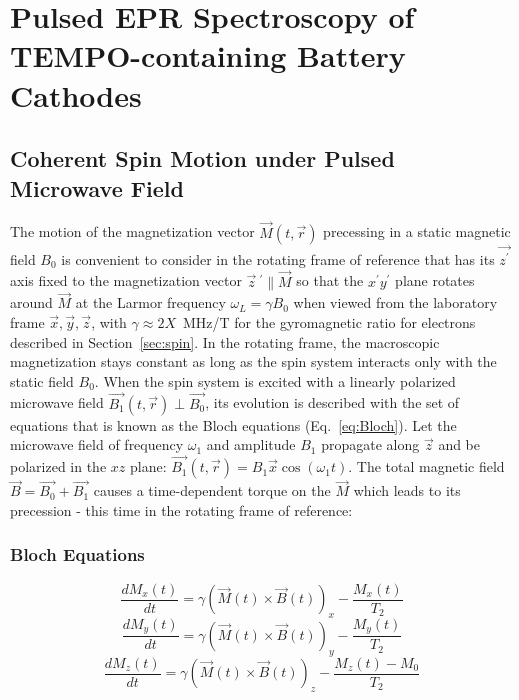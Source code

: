 \chapter{Pulsed EPR Spectroscopy of TEMPO-containing Battery Cathodes}
\label{ch:pulsed_epr}

\section{Coherent Spin Motion under Pulsed Microwave Field}
The motion of the magnetization vector $\vec{M}(t,\vec{r})$ precessing in a static magnetic field $B_0$ is convenient to consider in the rotating frame of reference that has its $\vec{z^{\prime}}$ axis fixed to the magnetization vector ${\vec{z}}~^{\prime}\parallel\vec{M}$ so that the $x^{\prime} y^{\prime}$ plane rotates around $\vec{M}$ at the Larmor frequency $\omega_L=\gamma B_0$ when viewed from the laboratory frame $\vec{x},\vec{y},\vec{z}$, with $\gamma\approx2X$~MHz/T for the gyromagnetic ratio for electrons described in Section~\ref{sec:spin}. In the rotating frame, the macroscopic magnetization stays constant as long as the spin system interacts only with the static field $B_0$. When the spin system is excited with a linearly polarized microwave field $\vec{B_1}(t,\vec{r})\perp\vec{B_0}$, its evolution is described with the set of equations that is known as the Bloch equations (Eq.~\ref{eq:Bloch}). Let the microwave field of frequency $\omega_1$ and amplitude $B_1$ propagate along $\vec{z}$ and be polarized in the $xz$ plane: $\vec{B_1}(t,\vec{r})=B_1\vec{x}\cos\left(\omega_1t\right)$. The total magnetic field $\vec{B}=\vec{B_0}+\vec{B_1}$ causes a time-dependent torque on the $\vec{M}$ which leads to its precession - this time in the rotating frame of reference:

\subsection{Bloch Equations}
\begin{equation}
\label{eq:Bloch}
\frac{dM_x(t)}{dt} = \gamma\left(\vec{M}(t)\times\vec{B}(t)\right)_x - \frac{M_x(t)}{T_2}
\end{equation}
\begin{equation}
\label{eq:Bloch}
\frac{dM_y(t)}{dt} = \gamma\left(\vec{M}(t)\times\vec{B}(t)\right)_y - \frac{M_y(t)}{T_2}
\end{equation}
\begin{equation}
\label{eq:Bloch}
\frac{dM_z(t)}{dt} = \gamma\left(\vec{M}(t)\times\vec{B}(t)\right)_z - \frac{M_z(t)-M_0}{T_2}
\end{equation}



